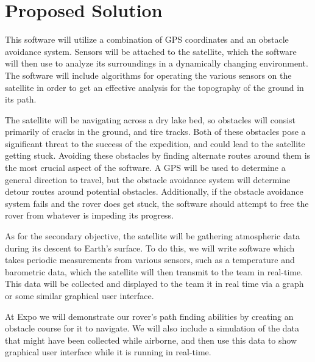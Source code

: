 \documentclass[10pt,onecolumn,draftclsnofoot,journal]{IEEEtran}
\begin{document}
\section*{\textbf{Proposed Solution}}
\noindent This software will utilize a combination of GPS coordinates and an obstacle avoidance system. Sensors will be attached to the satellite, which the software will then use to analyze its surroundings in a dynamically changing environment. The software will include algorithms for operating the various sensors on the satellite in order to get an effective analysis for the topography of the ground in its path.
\par\vspace{3mm} 
\noindent The satellite will be navigating across a dry lake bed, so obstacles will consist primarily of cracks in the ground, and tire tracks. Both of these obstacles pose a significant threat to the success of the expedition, and could lead to the satellite getting stuck. Avoiding these obstacles by finding alternate routes around them is the most crucial aspect of the software. A GPS will be used to determine a general direction to travel, but the obstacle avoidance system will determine detour routes around potential obstacles. Additionally, if the obstacle avoidance system fails and the rover does get stuck, the software should attempt to free the rover from whatever is impeding its progress. 
\par\vspace{3mm}
\noindent As for the secondary objective, the satellite will be gathering atmospheric data during its descent to Earth’s surface. To do this, we will write software which takes periodic measurements from various sensors, such as a temperature and barometric data, which the satellite will then transmit to the team in real-time. This data will be collected and displayed to the team it in real time via a graph or some similar graphical user interface. 
\par\vspace{3mm}
\noindent At Expo we will demonstrate our rover's path finding abilities by creating an obstacle course for it to navigate. We will also include a simulation of the data that might have been collected while airborne, and then use this data to show graphical user interface while it is running in real-time.
\end{document}
